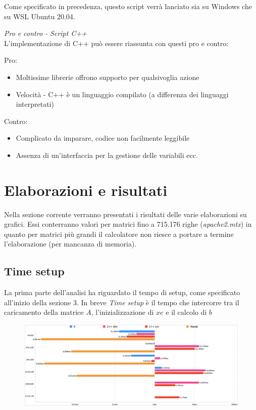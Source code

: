 \documentclass[preprint,12pt]{elsarticle}
\begin{document}
Come specificato in precedenza, questo script verrà lanciato sia su Windows che su WSL Ubuntu 20.04.
\medskip


\textit{Pro e contro - Script C++}\\
\vspace{4mm}
L'implementazione di C++ può essere riassunta con questi pro e contro:

Pro:
\begin{itemize}
	\item Moltissime librerie offrono supporto per qualsivoglia azione
	\item Velocità - C++ è un linguaggio compilato (a differenza dei linguaggi interpretati)
\end{itemize}

Contro:
\begin{itemize}
	\item Complicato da imparare, codice non facilmente leggibile
	\item Assenza di un'interfaccia per la gestione delle variabili ecc.
\end{itemize}

\newpage


\section{Elaborazioni e risultati}

Nella sezione corrente verranno presentati i risultati delle varie elaborazioni su grafici. Essi conterranno valori per matrici fino a 715.176 righe (\textit{apache2.mtx}) in quanto per matrici più grandi il calcolatore non riesce a portare a termine l'elaborazione (per mancanza di memoria).

\subsection{Time setup}La prima parte dell'analisi ha riguardato il tempo di setup, come specificato all'inizio della sezione 3.
In breve \textit{Time setup} è il tempo che intercorre tra il caricamento della matrice $A$, l'inizializzazione di $xe$ e il calcolo di $b$

\begin{figure}[H]
	\centering
	\includegraphics[width=\linewidth]{setup1}
\end{figure}
\end{document}
